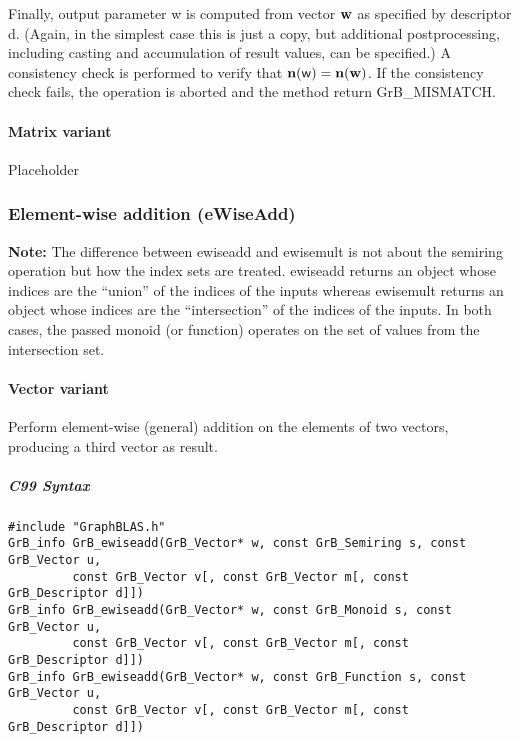 Finally, output parameter {\sf w} is computed from vector ${\bf w}$
as specified by descriptor {\sf d}. (Again, in the simplest case this
is just a copy, but additional postprocessing, including casting and
accumulation of result values, can be specified.)  A consistency check is
performed to verify that $\bold{n}({\sf w}) = \bold{n}({\bf w})$. If
the consistency check fails, the operation is aborted and the method
return {\sf GrB\_MISMATCH}.


\paragraph{Matrix variant}

Placeholder


\subsubsection{Element-wise addition ({\sf eWiseAdd})}

{\bf Note:} The difference between {\sf ewiseadd} and {\sf ewisemult} is not about the semiring operation but how the index sets are treated.
 {\sf ewiseadd} returns an object whose indices are the ``union'' of the indices of the inputs whereas  
 {\sf ewisemult} returns an object whose indices are the ``intersection'' of the indices of the inputs. In both cases, the passed monoid (or function) operates on the 
 set of values from the intersection set. 

\paragraph{Vector variant}

Perform element-wise (general) addition on the elements of two vectors,
producing a third vector as result.

\subparagraph{C99 Syntax}

\begin{verbatim}
#include "GraphBLAS.h"
GrB_info GrB_ewiseadd(GrB_Vector* w, const GrB_Semiring s, const GrB_Vector u,
         const GrB_Vector v[, const GrB_Vector m[, const GrB_Descriptor d]])
GrB_info GrB_ewiseadd(GrB_Vector* w, const GrB_Monoid s, const GrB_Vector u,
         const GrB_Vector v[, const GrB_Vector m[, const GrB_Descriptor d]])
GrB_info GrB_ewiseadd(GrB_Vector* w, const GrB_Function s, const GrB_Vector u,
         const GrB_Vector v[, const GrB_Vector m[, const GrB_Descriptor d]])
\end{verbatim}

